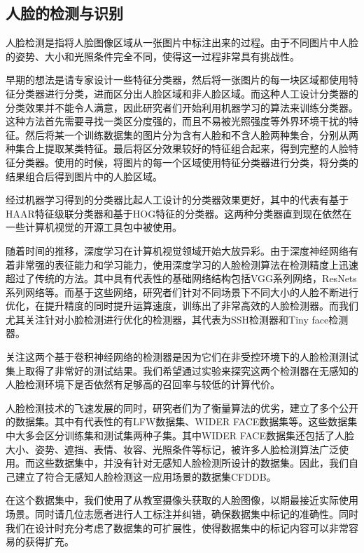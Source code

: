\subsection{人脸的检测与识别}

人脸检测是指将人脸图像区域从一张图片中标注出来的过程。由于不同图片中人脸的姿势、大小和光照条件完全不同，使得这一过程非常具有挑战性。

早期的想法是请专家设计一些特征分类器，然后将一张图片的每一块区域都使用特征分类器进行分类，进而区分出人脸区域和非人脸区域。而这种人工设计分类器的分类效果并不能令人满意，因此研究者们开始利用机器学习的算法来训练分类器。这种方法首先需要寻找一类区分度强的，而且不易被光照强度等外界环境干扰的特征。然后将某一个训练数据集的图片分为含有人脸和不含人脸两种集合，分别从两种集合上提取某类特征。最后将区分效果较好的特征组合起来，得到完整的人脸特征分类器。使用的时候，将图片的每一个区域使用特征分类器进行分类，将分类的结果组合后得到图片中的人脸区域。

经过机器学习得到的分类器比起人工设计的分类器效果更好，其中的代表有基于HAAR特征级联分类器\cite{viola2004robust}和基于HOG特征的分类器\cite{dalal2005histograms}。这两种分类器直到现在依然在一些计算机视觉的开源工具包中被使用。

随着时间的推移，深度学习在计算机视觉领域开始大放异彩。由于深度神经网络有着非常强的表征能力和学习能力，使用深度学习的人脸检测算法在检测精度上迅速超过了传统的方法。其中具有代表性的基础网络结构包括VGG系列网络\cite{simonyan2014very}，ResNets系列网络\cite{he2016deep}等。而基于这些网络，研究者们针对不同场景下不同大小的人脸不断进行优化，在提升精度的同时提升运算速度，训练出了非常高效的人脸检测器。而我们尤其关注针对小脸检测进行优化的检测器，其代表为SSH检测器\cite{najibi2017ssh}和Tiny face检测器\cite{hu2017finding}。

关注这两个基于卷积神经网络的检测器是因为它们在非受控环境下的人脸检测测试集上取得了非常好的测试结果。我们希望通过实验来探究这两个检测器在无感知的人脸检测环境下是否依然有足够高的召回率与较低的计算代价。

人脸检测技术的飞速发展的同时，研究者们为了衡量算法的优劣，建立了多个公开的数据集。其中有代表性的有LFW数据集\cite{huang2007labeled}、WIDER FACE数据集\cite{yang2016wider}等。这些数据集中大多会区分训练集和测试集两种子集。其中WIDER FACE数据集还包括了人脸大小、姿势、遮挡、表情、妆容、光照条件等标记，被许多人脸检测算法广泛使用。而这些数据集中，并没有针对无感知人脸检测所设计的数据集。因此，我们自己建立了符合无感知人脸检测这一应用场景的数据集CFDDB。

在这个数据集中，我们使用了从教室摄像头获取的人脸图像，以期最接近实际使用场景。同时请几位志愿者进行人工标注并纠错，确保数据集中标记的准确性。同时我们在设计时充分考虑了数据集的可扩展性，使得数据集中的标记内容可以非常容易的获得扩充。

